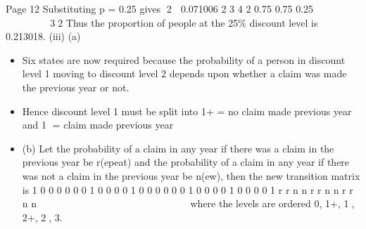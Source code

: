 \documentclass[a4paper,12pt]{article}
\begin{document}
Page 12
Substituting p = 0.25 gives 2  0.071006
2
3 4 2
0.75 0.75
0.25
        
 
 32
Thus the proportion of people at the 25\% discount level is 0.213018. 
(iii) (a) 
\begin{itemize}
\item Six states are now required
because the probability of a person in discount level 1 moving to
discount level 2 depends upon whether a claim was made the previous
year or not.
\item Hence discount level 1 must be split into
1+ = no claim made previous year and
1 = claim made previous year
\item (b) Let the probability of a claim in any year if there was a claim in the
previous year be r(epeat) and the probability of a claim in any year if
there was not a claim in the previous year be n(ew), then the new
transition matrix is
1 0 0 0 0
0 0 1 0 0
0 0 1 0 0
0 0 0 0 1
0 0 0 0 1
0 0 0 0 1
r r
n n
r r
n n
r r
n n
  
    
  
 
  
  
    
where the levels are ordered 0, 1+, 1, 2+, 2, 3. 
\end{itemize}
\end{document}
